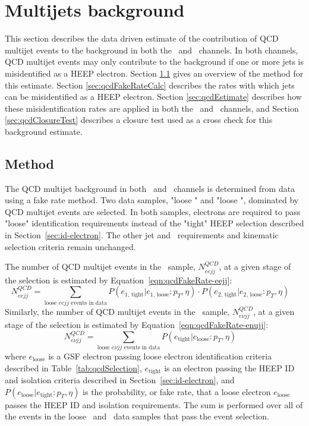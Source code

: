 \section{Multijets background}
\label{sec:qcd} 

This section describes the data driven estimate
of the contribution of QCD multijet events to the 
background in both the \eejj~and \enujj~channels.
In both channels, QCD multijet events may only contribute
to the background if one or more jets is 
misidentified as a HEEP electron.
Section \ref{sec:qcdDescription} gives an overview of the method for this estimate.
Section \ref{sec:qcdFakeRateCalc} describes the rates with which jets can be
misidentified as a HEEP electron.
Section \ref{sec:qcdEstimate} describes how these misidentification rates
are applied in both the \eejj~and \enujj~channels, 
and Section \ref{sec:qcdClosureTest} describes a closure test
used as a cross check for this background estimate.

\subsection{Method}
\label{sec:qcdDescription}

The QCD multijet background in both \eejj~and \enujj~channels 
is determined from data using a fake rate method.
Two data samples, "loose \eejj" and "loose \enujj", 
dominated by QCD multijet events are selected.  In both samples, electrons are 
required to pass "loose" identification requirements instead of the "tight" HEEP selection 
described in Section~\ref{sec:id-electron}.
The other jet and \MET~requirements and kinematic 
selection criteria remain unchanged.

The number of QCD multijet events in the \eejj~sample, $N_{eejj}^{QCD}$, 
at a given stage of the selection is estimated by Equation~\ref{eqn:qcdFakeRate-eejj}:
\begin{equation}
  N_{eejj}^{QCD} = \sum_{\text{loose } eejj \text{ events in data}} P(e_{1\text{, tight}} | e_{\text{1, loose}}: p_{T}, \eta) \cdot P(e_{2\text{, tight}} | e_{\text{2, loose}}: p_{T}, \eta) \quad
  \label{eqn:qcdFakeRate-eejj}
\end{equation}
Similarly, the number of QCD multijet events in the \enujj~sample, $N_{e \nu jj}^{QCD}$, 
at a given stage of the selection is estimated by Equation~\ref{eqn:qcdFakeRate-enujj}:
\begin{equation}
  N_{e \nu jj}^{QCD} = \sum_{\text{loose } e \nu jj \text{ events in data}} P(e_{\text{tight}} | e_{\text{loose}}: p_{T}, \eta) \quad
  \label{eqn:qcdFakeRate-enujj}
\end{equation}
where 
$e_{\text{loose}}$ is a GSF electron passing loose electron identification      
criteria described in Table~\ref{tab:qcdSelection}, 
$e_{\text{tight}}$ is an electron passing the HEEP ID and isolation criteria 
described in Section~\ref{sec:id-electron}, and 
$P(e_{\text{loose}} | e_{\text{tight}}: p_{T}, \eta)$ is the probability, or fake
rate, that a loose electron $e_{\text{loose}}$ passes the HEEP ID and isolation requirements.  
The sum is performed over all of the events in the loose \eejj~and \enujj~data samples that
pass the event selection.  

